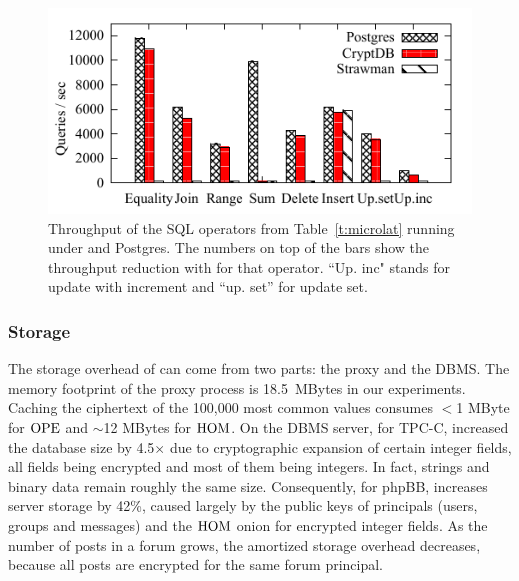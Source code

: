 \begin{figure}[t!] 
\centering
\includegraphics{fig/microbars.pdf} 
\caption{Throughput of the SQL operators from Table~\ref{t:microlat}
  running under \name and Postgres. The numbers on top of the bars
  show the throughput reduction with \name{} for that operator. ``Up. inc" stands for update with increment and ``up. set'' for update set.}
\label{fig:microtput}
\end{figure}


\subsubsection{Storage}

The storage overhead of \name can come from two parts: the proxy
and the DBMS\@.
The memory footprint of the \name{} proxy process is
18.5~MBytes in our experiments.
Caching the ciphertext of the 100,000 most common values consumes
$<$1 MByte for $\textrm{OPE}$ and $\sim$12 MBytes for $\textrm{HOM}$.  On the DBMS
server, for TPC-C, \name{} increased the database size by 4.5$\times$
due to cryptographic expansion of certain integer fields, all fields being encrypted and most of them being integers. In fact, strings and
binary data remain roughly the same size. Consequently,
for phpBB, \name{} increases server storage by 42\%, caused largely
by the public keys of principals (users, groups and messages) and the
$\textrm{HOM}$ onion for encrypted integer fields.
As the number of posts in a forum grows, the amortized storage overhead
decreases, because all posts are encrypted for the same forum principal.


